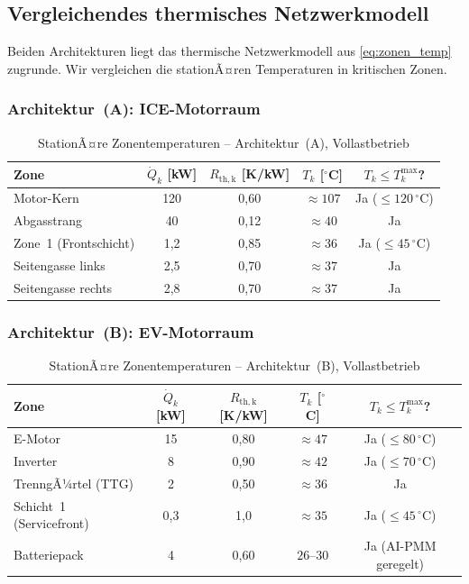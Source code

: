 ﻿\documentclass[12pt,a4paper]{article}
\begin{document}
\subsection{Vergleichendes thermisches Netzwerkmodell}

Beiden Architekturen liegt das thermische Netzwerkmodell aus
\eqref{eq:zonen_temp} zugrunde. Wir vergleichen die stationÃ¤ren Temperaturen
in kritischen Zonen.

\subsubsection{Architektur~(A): ICE-Motorraum}

\begin{table}[H]
	\centering
	\caption{StationÃ¤re Zonentemperaturen -- Architektur~(A), Vollastbetrieb}
	\label{tab:temp_a}
	\begin{tabular}{lcccc}
		\toprule
		\textbf{Zone} & $\dot{Q}_k$ [kW] & $R_\mathrm{th,k}$ [K/kW] &
		$T_k$ [$^\circ$C] & $T_k \leq T_k^\mathrm{max}$? \\
		\midrule
		Motor-Kern           & 120 & 0{,}60 & $\approx 107$ & Ja ($\leq 120\,^\circ$C) \\
		Abgasstrang          & 40  & 0{,}12 & $\approx 40$  & Ja \\
		Zone~1 (Frontschicht)& 1{,}2 & 0{,}85 & $\approx 36$ & Ja ($\leq 45\,^\circ$C) \\
		Seitengasse links    & 2{,}5 & 0{,}70 & $\approx 37$ & Ja \\
		Seitengasse rechts   & 2{,}8 & 0{,}70 & $\approx 37$ & Ja \\
		\bottomrule
	\end{tabular}
\end{table}

\subsubsection{Architektur~(B): EV-Motorraum}

\begin{table}[H]
	\centering
	\caption{StationÃ¤re Zonentemperaturen -- Architektur~(B), Vollastbetrieb}
	\label{tab:temp_b}
	\begin{tabular}{lcccc}
		\toprule
		\textbf{Zone} & $\dot{Q}_k$ [kW] & $R_\mathrm{th,k}$ [K/kW] &
		$T_k$ [$^\circ$C] & $T_k \leq T_k^\mathrm{max}$? \\
		\midrule
		E-Motor              & 15  & 0{,}80 & $\approx 47$  & Ja ($\leq 80\,^\circ$C) \\
		Inverter             & 8   & 0{,}90 & $\approx 42$  & Ja ($\leq 70\,^\circ$C) \\
		TrenngÃ¼rtel (TTG)    & 2   & 0{,}50 & $\approx 36$  & Ja \\
		Schicht~1 (Servicefront) & 0{,}3 & 1{,}0 & $\approx 35$ & Ja ($\leq 45\,^\circ$C) \\
		Batteriepack         & 4   & 0{,}60 & $26\text{--}30$ & Ja (AI-PMM geregelt) \\
		\bottomrule
	\end{tabular}
\end{table}
\end{document}
